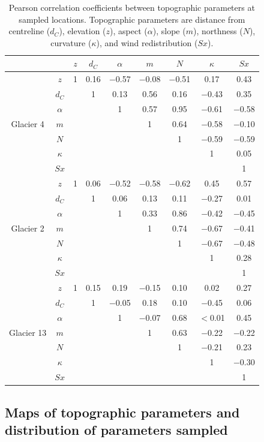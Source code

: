\documentclass{sfuthesis}
\newcommand{\params}{Topographic parameters are distance from centreline ($d_C$), elevation ($z$), aspect ($\alpha$), slope ($m$), northness ($N$), curvature ($\kappa$), and wind redistribution ($Sx$). }
\begin{document}
\begin{table}[H]
\centering
\caption{Pearson correlation coefficients between topographic parameters at sampled locations. \params}
\label{tab:pearson_correlation}
\begin{tabular}{cc|ccccccc}
 &  & $z$ & $d_C$ & $\alpha$ & $m$ & $N$ & $\kappa$ & $Sx$ \\ \hline
\multirow{7}{*}{Glacier 4} & $z$ & 1 & 0.16 & $-$0.57 & $-$0.08 & $-$0.51 & 0.17 & 0.43 \\
 & $d_C$ &  & 1 & 0.13 & 0.56 & 0.16 & $-$0.43 & 0.35 \\
 & $\alpha$ &   &  & 1 & 0.57 & 0.95 & $-$0.61 & $-$0.58 \\
 & $m$ &   &   &   & 1 & 0.64 & $-$0.58 & $-$0.10 \\
 & $N$ &   &   &   &   & 1 & $-$0.59 & $-$0.59 \\
 & $\kappa$ &   &   &   &   &   & 1 & 0.05 \\
 & $Sx$ &   &   &   &   &   &   & 1 \\ \hline
\multirow{7}{*}{Glacier 2} & $z$ & 1 & 0.06 & $-$0.52 & $-$0.58 & $-$0.62 & 0.45 & 0.57 \\
 & $d_C$ &   & 1 & 0.06 & 0.13 & 0.11 & $-$0.27 & 0.01 \\
 & $\alpha$ &   &  & 1 & 0.33 & 0.86 & $-$0.42 & $-$0.45 \\
 & $m$ &   &   &   & 1 & 0.74 & $-$0.67 & $-$0.41 \\
 & $N$ &   &   &   &   & 1 & $-$0.67 & $-$0.48 \\
 & $\kappa$ & &   &   &   &   & 1 & 0.28 \\
 & $Sx$ &   &   &   &   &   &   & 1 \\ \hline
\multirow{7}{*}{Glacier 13} & $z$ & 1 & 0.15 & 0.19 & $-$0.15 & 0.10 & 0.02 & 0.27 \\
 & $d_C$ &   & 1 & $-$0.05 & 0.18 & 0.10 & $-$0.45 & 0.06 \\
 & $\alpha$ &   &   & 1 & $-$0.07 & 0.68 & $<$0.01 & 0.45 \\
 & $m$ &   &   &   & 1 & 0.63 & $-$0.22 & $-$0.22 \\
 & $N$ &   &   &   &   & 1 & $-$0.21 & 0.23 \\
 & $\kappa$ &   &   &   &   &   & 1 & $-$0.30 \\
 & $Sx$ &   &   &   &   &   &   & 1
\end{tabular}
\end{table}


\subsection{Maps of topographic parameters and distribution of parameters sampled}
\end{document}
